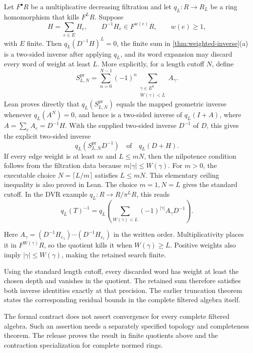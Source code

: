\begin{corollary}\label{cor:finite-precision}
Let $F^\bullet R$ be a multiplicative decreasing filtration and let
$q_L:R\to R_L$ be a ring homomorphism that kills $F^L R$. Suppose
\[
H=\sum_{e\in E}H_e,
\qquad D^{-1}H_e\in F^{w(e)}R,
\qquad w(e)\ge1,
\]
with $E$ finite. Then $q_L(D^{-1}H)^L=0$, the finite sum in
\cref{thm:weighted-inverse}(a) is a two-sided inverse after applying $q_L$,
and its word expansion may discard every word of weight at least $L$.
More explicitly, for a length cutoff $N$, define
\[
S^{\mathrm{pr}}_{L,N}
=
\sum_{n=0}^{N-1}(-1)^n
\sum_{\substack{\gamma\in E^n\\W(\gamma)<L}}A_\gamma.
\]
Lean proves directly that $q_L(S^{\mathrm{pr}}_{L,N})$ equals the mapped
geometric inverse whenever $q_L(A^N)=0$, and hence is a two-sided inverse of
$q_L(I+A)$, where $A=\sum_eA_e=D^{-1}H$. With the supplied two-sided
inverse $D^{-1}$ of $D$, this gives the explicit two-sided inverse
\[
\boxed{q_L\!\left(S^{\mathrm{pr}}_{L,N}D^{-1}\right)}
\quad\text{of}\quad q_L(D+H).
\]
If every edge weight is at least $m$ and $L\le mN$, then the nilpotence
condition follows from the filtration data because
$m|\gamma|\le W(\gamma)$. For $m>0$, the executable choice
$N=\lceil L/m\rceil$ satisfies $L\le mN$. This elementary ceiling inequality
is also proved in Lean. The choice $m=1,N=L$ gives the standard cutoff.
In the DVR example $q_L:R\to R/\pi^L R$, this reads
\[
q_L(T)^{-1}
=
q_L\!\left(\sum_{W(\gamma)<L}
(-1)^{|\gamma|}A_\gamma D^{-1}\right).
\]
\end{corollary}

Here $A_\gamma=(D^{-1}H_{e_1})\cdots(D^{-1}H_{e_r})$ in the written
order. Multiplicativity places it in $F^{W(\gamma)}R$, so the quotient kills
it when $W(\gamma)\ge L$. Positive weights also imply
$|\gamma|\le W(\gamma)$, making the retained search finite.

\begin{interpretation}
Using the standard length cutoff, every discarded word has weight at least the chosen depth and vanishes in the quotient. The retained sum therefore satisfies both inverse identities exactly at that precision. The earlier truncation theorem states the corresponding residual bounds in the complete filtered algebra itself.
\end{interpretation}

The formal contract does not assert convergence for every complete filtered algebra. Such an assertion needs a separately specified
topology and completeness theorem. The release proves the result in finite
quotients above and the contraction specialization for complete normed rings.

